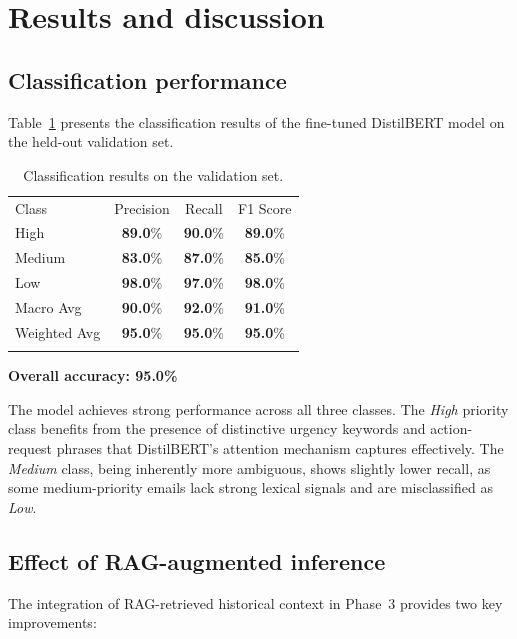 \documentclass[3p,times,procedia]{elsarticle}
\begin{document}
\section{Results and discussion}
\label{sec:results}

\subsection{Classification performance}

Table~\ref{tab:results} presents the classification results of the fine-tuned DistilBERT model on the held-out validation set.

\begin{table}[h]
\caption{Classification results on the validation set.}
\label{tab:results}
\begin{tabular*}{\hsize}{@{\extracolsep{\fill}}lccc@{}}
\toprule
Class & Precision & Recall & F1 Score \\
\colrule
High     & \textbf{89.0}\% & \textbf{90.0}\% & \textbf{89.0}\% \\
Medium   & \textbf{83.0}\% & \textbf{87.0}\% & \textbf{85.0}\% \\
Low      & \textbf{98.0}\% & \textbf{97.0}\% & \textbf{98.0}\% \\
\colrule
Macro Avg & \textbf{90.0}\% & \textbf{92.0}\% & \textbf{91.0}\% \\
Weighted Avg & \textbf{95.0}\% & \textbf{95.0}\% & \textbf{95.0}\% \\
\botrule
\end{tabular*}
\end{table}

\noindent \textbf{Overall accuracy: 95.0\%}

The model achieves strong performance across all three classes. The \textit{High} priority class benefits from the presence of distinctive urgency keywords and action-request phrases that DistilBERT's attention mechanism captures effectively. The \textit{Medium} class, being inherently more ambiguous, shows slightly lower recall, as some medium-priority emails lack strong lexical signals and are misclassified as \textit{Low}.

\subsection{Effect of RAG-augmented inference}

The integration of RAG-retrieved historical context in Phase~3 provides two key improvements:
\end{document}
